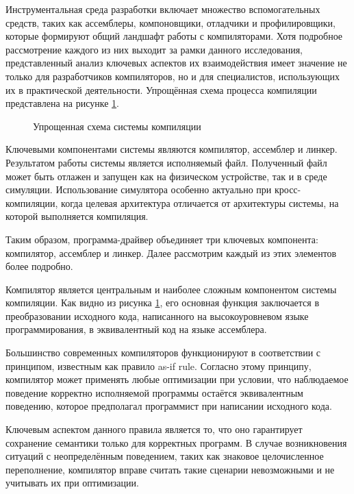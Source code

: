 Инструментальная среда разработки включает множество вспомогательных средств, таких как ассемблеры, компоновщики, отладчики и профилировщики, которые формируют общий ландшафт работы с компиляторами. Хотя подробное рассмотрение каждого из них выходит за рамки данного исследования, представленный анализ ключевых аспектов их взаимодействия имеет значение не только для разработчиков компиляторов, но и для специалистов, использующих их в практической деятельности.
Упрощённая схема процесса компиляции представлена на рисунке \ref{fig:tulchain}.

\begin{figure}[H]
	\centering
	\caption{Упрощенная схема системы компиляции}
	\label{fig:tulchain}
\end{figure}

 Ключевыми компонентами системы являются компилятор, ассемблер и линкер. Результатом работы системы является исполняемый файл. Полученный файл может быть отлажен и запущен как на физическом устройстве, так и в среде симуляции. Использование симулятора особенно актуально при кросс-компиляции, когда целевая архитектура отличается от архитектуры системы, на которой выполняется компиляция.

Таким образом, программа-драйвер объединяет три ключевых компонента: компилятор, ассемблер и линкер. Далее рассмотрим каждый из этих элементов более подробно.

Компилятор является центральным и наиболее сложным компонентом системы компиляции. Как видно из рисунка \ref{fig:tulchain}, его основная функция заключается в преобразовании исходного кода, написанного на высокоуровневом языке программирования, в эквивалентный код на языке ассемблера. 

Большинство современных компиляторов функционируют в соответствии с принципом, известным как правило as-if rule. Согласно этому принципу, компилятор может применять любые оптимизации при условии, что наблюдаемое поведение корректно исполняемой программы остаётся эквивалентным поведению, которое предполагал программист при написании исходного кода.

Ключевым аспектом данного правила является то, что оно гарантирует сохранение семантики только для корректных программ. В случае возникновения ситуаций с неопределённым поведением, таких как знаковое целочисленное переполнение, компилятор вправе считать такие сценарии невозможными и не учитывать их при оптимизации.


